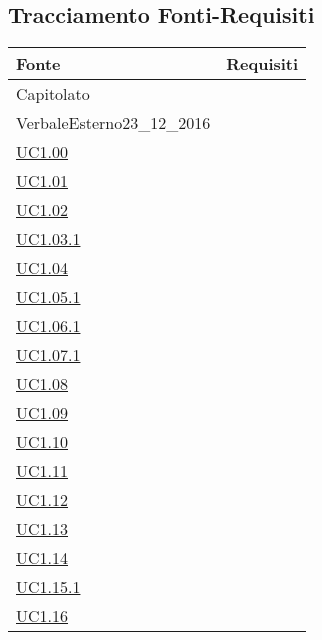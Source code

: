 \subsection{Tracciamento Fonti-Requisiti}

\begin{longtable}{|P{6cm}|P{6cm}|}
	\hline \textbf{Fonte} & \textbf{Requisiti}\\
	\hline Capitolato &  \linebreak {} \linebreak {} \linebreak {} \linebreak {} \\
	\hline VerbaleEsterno23\_12\_2016 &  \linebreak {} \\
	\hline \hyperref[UC1.00]{UC1.00} &  \\
	\hline \hyperref[UC1.01]{UC1.01} &  \\
	\hline \hyperref[UC1.02]{UC1.02} &  \\
	\hline \hyperref[UC1.03.1]{UC1.03.1} &  \\
	\hline \hyperref[UC1.04]{UC1.04} &  \\
	\hline \hyperref[UC1.05.1]{UC1.05.1} &  \\
	\hline \hyperref[UC1.06.1]{UC1.06.1} &  \\
	\hline \hyperref[UC1.07.1]{UC1.07.1} &  \\
	\hline \hyperref[UC1.08]{UC1.08} &  \\
	\hline \hyperref[UC1.09]{UC1.09} &  \\
	\hline \hyperref[UC1.10]{UC1.10} &  \\
	\hline \hyperref[UC1.11]{UC1.11} &  \\	
	\hline \hyperref[UC1.12]{UC1.12} &  \\
	\hline \hyperref[UC1.13]{UC1.13} &  \\	
	\hline \hyperref[UC1.14]{UC1.14} &  \\
	\hline \hyperref[UC1.15.1]{UC1.15.1} &  \\
	\hline \hyperref[UC1.16]{UC1.16} &  \\

\end{longtable}
